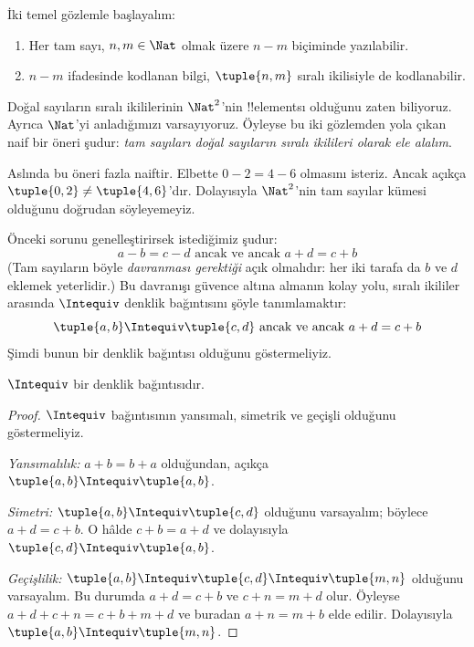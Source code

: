 


İki temel gözlemle başlayalım:
	\begin{enumerate}
		\item Her tam sayı, $n, m \in\Nat$ olmak üzere $n - m$ biçiminde yazılabilir.
		\item $n - m$ ifadesinde kodlanan bilgi, $\tuple{n, m}$ sıralı ikilisiyle de kodlanabilir.
	\end{enumerate}
Doğal sayıların sıralı ikililerinin $\Nat^2$'nin !!{element}s{}ı olduğunu
zaten biliyoruz. Ayrıca $\Nat$'yi anladığımızı varsayıyoruz. Öyleyse bu iki
gözlemden yola çıkan naif bir öneri şudur: \emph{tam sayıları doğal sayıların
sıralı ikilileri olarak ele alalım}.

Aslında bu öneri fazla naiftir. Elbette $0- 2 = 4 - 6$ olmasını isteriz.
Ancak açıkça $\tuple{0, 2 }\neq \tuple{4, 6}$'dır. Dolayısıyla $\Nat^2$'nin
tam sayılar kümesi olduğunu doğrudan söyleyemeyiz.

Önceki sorunu genelleştirirsek istediğimiz şudur:
	$$a - b = c - d \text{ ancak ve ancak }a + d = c + b$$
(Tam sayıların böyle \emph{davranması gerektiği} açık olmalıdır: her iki
tarafa da $b$ ve $d$ eklemek yeterlidir.) Bu davranışı güvence altına almanın
kolay yolu, sıralı ikililer arasında $\Intequiv$ denklik bağıntısını şöyle
tanımlamaktır:
$$\tuple{ a, b } \Intequiv \tuple{c, d}\text{ ancak ve ancak }a + d = c + b$$
Şimdi bunun bir denklik bağıntısı olduğunu göstermeliyiz.
\begin{prop} $\Intequiv$ bir denklik bağıntısıdır.
\end{prop}
	\begin{proof}
	$\Intequiv$ bağıntısının yansımalı, simetrik ve geçişli olduğunu göstermeliyiz.
	
	\emph{Yansımalılık:} $a + b = b + a$ olduğundan, açıkça
	$\tuple{a, b} \Intequiv \tuple{a, b}$.
	
	\emph{Simetri:} $\tuple{a, b} \Intequiv \tuple{c, d}$ olduğunu varsayalım;
	böylece $a + d = c + b$. O hâlde $c + b = a + d$ ve dolayısıyla
	$\tuple{c, d} \Intequiv \tuple{a, b}$.
	
	\emph{Geçişlilik:} $\tuple{a, b} \Intequiv \tuple{c, d}\Intequiv
	\tuple{m, n}$ olduğunu varsayalım. Bu durumda $a + d = c + b$ ve
	$c + n = m + d$ olur. Öyleyse $a + d + c + n = c + b + m + d$ ve
	buradan $a + n = m + b$ elde edilir. Dolayısıyla
	$\tuple{a, b } \Intequiv \tuple{m, n}$.
\end{proof}

